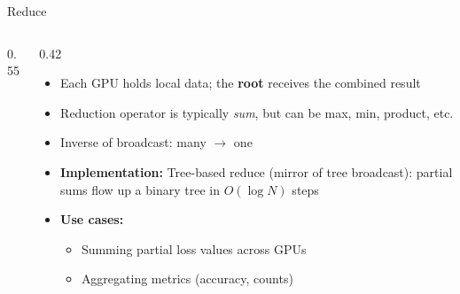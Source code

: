 \begin{frame}{Reduce}
\begin{columns}
\begin{column}{0.55\textwidth}
\begin{center}
      \end{center}
    \end{column}
    \begin{column}{0.42\textwidth}
      \begin{itemize}
        \item Each GPU holds local data; the \textbf{root} receives the combined result
        \item Reduction operator is typically \emph{sum}, but can be max, min, product, etc.
        \item Inverse of broadcast: many $\to$ one
        \item \textbf{Implementation:} Tree-based reduce (mirror of tree broadcast): partial sums flow up a binary tree in $O(\log N)$ steps
        \item \textbf{Use cases:}
          \begin{itemize}
            \item Summing partial loss values across GPUs
            \item Aggregating metrics (accuracy, counts)
          \end{itemize}
      \end{itemize}
    \end{column}
  \end{columns}
\end{frame}

